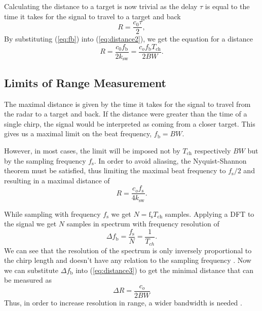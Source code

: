 Calculating the distance to a target is now trivial as the delay $\tau$ is equal to the time it takes for the signal to travel to a target and back \cite{graham2005}
\begin{equation}
  R = \frac{c_0 \tau}{2},
  \label{eq:distance2}
\end{equation}
By substituting (\ref{eq:fb}) into (\ref{eq:distance2}), we get the equation for a distance \cite{graham2005}
\begin{equation}
  R = \frac{c_0 f_\mathrm{b}}{2k_\mathrm{sw}}= \frac{c_o f_\mathrm{b} T_{\mathrm{ch}}}{2 BW}.
  \label{eq:distance3}
\end{equation}


\subsection{Limits of Range Measurement}

The maximal distance is given by the time it takes for the signal to travel from the radar to a target and back.
If the distance were greater than the time of a single chirp, the signal would be interpreted as coming from a closer target.
This gives us a maximal limit on the beat frequency, $f_\mathrm{b} = BW$.

However, in most cases, the limit will be imposed not by $T_\mathrm{ch}$ respectively $BW$ but by the sampling frequency $f_\mathrm{s}$.
In order to avoid aliasing, the Nyquist-Shannon theorem must be satisfied, thus limiting the maximal beat frequency to $f_\mathrm{s}/2$ and resulting in a maximal distance of \cite{jankiraman2018}
\begin{equation}
  R = \frac{c_o f_\mathrm{s}}{4k_\mathrm{sw}}.
  \label{eq:distance4max}
\end{equation}

While sampling with frequency $f_\mathrm{s}$ we get $N =\mathrm{f}_\mathrm{s} T_\mathrm{ch}$ samples.
Applying a DFT to the signal we get $N$ samples in spectrum with frequency resolution of
\begin{equation}
  \Delta f_\mathrm{b} = \frac{f_\mathrm{s}}{N} = \frac{1}{T_{ch}}.
  \label{eq:resolution}
\end{equation}
We can see that the resolution of the spectrum is only inversely proportional to the chirp length and doesn't have any relation to the sampling frequency  \cite{jankiraman2018}.
Now we can substitute $\Delta f_\mathrm{b}$ into (\ref{eq:distance3}) to get the minimal distance that can be measured as
\begin{equation}
  \Delta R = \frac{c_o}{2BW}
  \label{eq:distance5min}
\end{equation}
Thus, in order to increase resolution in range, a wider bandwidth is needed \cite{graham2005}.

